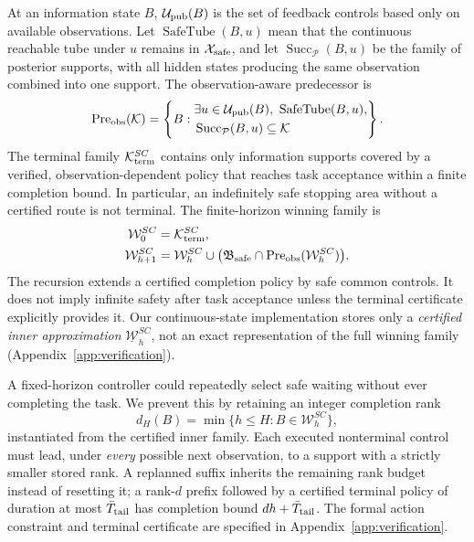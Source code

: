 \documentclass[letterpaper]{article} %
\begin{document}
At an information state $B$, $\mathcal U_{\rm pub}(B)$ is the set of feedback controls based only on available observations. Let $\operatorname{SafeTube}(B,u)$ mean that the continuous reachable tube under $u$ remains in $\mathcal X_{\rm safe}$, and let $\operatorname{Succ}_{\mathcal P}(B,u)$ be the family of posterior supports, with all hidden states producing the same observation combined into one support. The observation-aware predecessor is
\begin{equation}
\operatorname{Pre}_{\rm obs}(\mathcal K)=
\left\{B:\begin{aligned}
&\exists u\in\mathcal U_{\rm pub}(B),\ \operatorname{SafeTube}(B,u),\\
&\operatorname{Succ}_{\mathcal P}(B,u)\subseteq\mathcal K
\end{aligned}\right\}.
\label{eq:pre-obs}
\end{equation}
The terminal family $\mathcal K_{\rm term}^{SC}$ contains only information supports covered by a verified, observation-dependent policy that reaches task acceptance within a finite completion bound. In particular, an indefinitely safe stopping area without a certified route is not terminal. The finite-horizon winning family is
\begin{equation}
\begin{aligned}
\mathcal W_0^{SC}&=\mathcal K_{\rm term}^{SC},\\
\mathcal W_{h+1}^{SC}&=\mathcal W_h^{SC}\cup
\big(\mathfrak B_{\rm safe}\cap\operatorname{Pre}_{\rm obs}(\mathcal W_h^{SC})\big).
\end{aligned}
\label{eq:sc-winning}
\end{equation}
The recursion extends a certified completion policy by safe common controls. It does not imply infinite safety after task acceptance unless the terminal certificate explicitly provides it. Our continuous-state implementation stores only a \emph{certified inner approximation} $\underline{\mathcal W}_h^{SC}$, not an exact representation of the full winning family (Appendix~\ref{app:verification}).

A fixed-horizon controller could repeatedly select safe waiting without ever completing the task. We prevent this by retaining an integer completion rank
\begin{equation}
d_H(B)=\min\{h\leq H:B\in\mathcal W_h^{SC}\},
\label{eq:sc-rank}
\end{equation}
instantiated from the certified inner family. Each executed nonterminal control must lead, under \emph{every} possible next observation, to a support with a strictly smaller stored rank. A replanned suffix inherits the remaining rank budget instead of resetting it; a rank-$d$ prefix followed by a certified terminal policy of duration at most $\bar T_{\rm tail}$ has completion bound $dh+\bar T_{\rm tail}$. The formal action constraint and terminal certificate are specified in Appendix~\ref{app:verification}.
\end{document}
